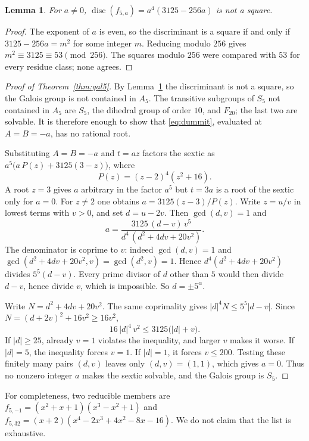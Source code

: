 \documentclass[11pt]{article}
\newtheorem{lemma}[theorem]{Lemma}
\theoremstyle{definition}
\theoremstyle{remark}
\newcommand{\disc}{\operatorname{disc}}
\begin{document}
\begin{lemma}\label{lem:nosquare}
For $a\neq 0$, $\disc(f_{5,a})=a^{4}(3125-256a)$ is not a square.
\end{lemma}

\begin{proof}
The exponent of $a$ is even, so the discriminant is a square if and only if
$3125-256a=m^{2}$ for some integer $m$. Reducing modulo $256$ gives
$m^{2}\equiv 3125\equiv 53\pmod{256}$. The squares modulo $256$ were compared with
$53$ for every residue class; none agrees.
\end{proof}

\begin{proof}[Proof of Theorem~\ref{thm:gal5}]
By Lemma~\ref{lem:nosquare} the discriminant is not a square, so the Galois group
is not contained in $A_5$. The transitive subgroups of $S_5$ not contained in
$A_5$ are $S_5$, the dihedral group of order $10$, and $F_{20}$; the last two are
solvable. It is therefore enough to show that \eqref{eq:dummit}, evaluated at
$A=B=-a$, has no rational root.

Substituting $A=B=-a$ and $t=az$ factors the sextic as
$a^{5}\bigl(a\,P(z)+3125(3-z)\bigr)$, where
\[
P(z)=(z-2)^{4}(z^{2}+16).
\]
A root $z=3$ gives $a$ arbitrary in the factor $a^{5}$ but $t=3a$ is a root of the
sextic only for $a=0$. For $z\neq 2$ one obtains
$a=3125(z-3)/P(z)$. Write $z=u/v$ in lowest terms with $v>0$, and set $d=u-2v$.
Then $\gcd(d,v)=1$ and
\[
a=\frac{3125\,(d-v)\,v^{5}}{d^{4}\,(d^{2}+4dv+20v^{2})}.
\]
The denominator is coprime to $v$: indeed $\gcd(d,v)=1$ and
$\gcd(d^{2}+4dv+20v^{2},v)=\gcd(d^{2},v)=1$. Hence $d^{4}(d^{2}+4dv+20v^{2})$
divides $5^{5}(d-v)$. Every prime divisor of $d$ other than $5$ would then divide
$d-v$, hence divide $v$, which is impossible. So $d=\pm 5^{\alpha}$.

Write $N=d^{2}+4dv+20v^{2}$. The same coprimality gives $|d|^{4}N\le 5^{5}|d-v|$.
Since $N=(d+2v)^{2}+16v^{2}\ge 16v^{2}$,
\[
16\,|d|^{4}\,v^{2}\le 3125\bigl(|d|+v\bigr).
\]
If $|d|\ge 25$, already $v=1$ violates the inequality, and larger $v$ makes it
worse. If $|d|=5$, the inequality forces $v=1$. If $|d|=1$, it forces $v\le 200$.
Testing these finitely many pairs $(d,v)$ leaves only $(d,v)=(1,1)$, which gives
$a=0$. Thus no nonzero integer $a$ makes the sextic solvable, and the Galois
group is $S_5$.
\end{proof}

For completeness, two reducible members are $f_{5,-1}=(x^{2}+x+1)(x^{3}-x^{2}+1)$
and $f_{5,32}=(x+2)(x^{4}-2x^{3}+4x^{2}-8x-16)$. We do not claim that the list is
exhaustive.
\end{document}
